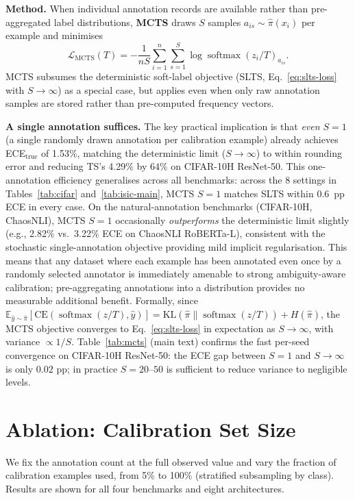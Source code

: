\documentclass[10pt,journal,compsoc]{IEEEtran}
\newcommand{\pihat}{\hat{\pi}}
\newcommand{\bE}{\mathbb{E}}
\newcommand{\KL}{\mathrm{KL}}
\begin{document}
\noindent\textbf{Method.}
When individual annotation records are available rather than pre-aggregated label distributions, \textbf{MCTS} draws $S$ samples $a_{is}\sim\pihat(x_i)$ per example and minimises
\[
  \mathcal{L}_{\text{MCTS}}(T) = -\frac{1}{nS}\sum_{i=1}^n\sum_{s=1}^S \log\operatorname{softmax}(z_i/T)_{a_{is}}.
\]
MCTS subsumes the deterministic soft-label objective (SLTS, Eq.~\ref{eq:slts-loss} with $S\!\to\!\infty$) as a special case, but applies even when only raw annotation samples are stored rather than pre-computed frequency vectors.

\noindent\textbf{A single annotation suffices.}
The key practical implication is that \emph{even $S=1$} (a single randomly drawn annotation per calibration example) already achieves ECE$_\text{true}$ of 1.53\%, matching the deterministic limit ($S\!\to\!\infty$) to within rounding error and reducing TS's 4.29\% by $64\%$ on CIFAR-10H ResNet-50.  This one-annotation efficiency generalises across all benchmarks: across the 8 settings in Tables~\ref{tab:cifar} and~\ref{tab:isic-main}, MCTS $S{=}1$ matches SLTS within 0.6~pp ECE in every case.  On the natural-annotation benchmarks (CIFAR-10H, ChaosNLI), MCTS $S{=}1$ occasionally \emph{outperforms} the deterministic limit slightly (e.g., 2.82\% vs.\ 3.22\% ECE on ChaosNLI RoBERTa-L), consistent with the stochastic single-annotation objective providing mild implicit regularisation.  This means that any dataset where each example has been annotated even once by a randomly selected annotator is immediately amenable to strong ambiguity-aware calibration; pre-aggregating annotations into a distribution provides no measurable additional benefit.  Formally, since $\bE_{\hat{y}\sim\pihat}[\mathrm{CE}(\operatorname{softmax}(z/T),\hat{y})] = \KL(\pihat\|\operatorname{softmax}(z/T)) + H(\pihat)$, the MCTS objective converges to Eq.~\eqref{eq:slts-loss} in expectation as $S\to\infty$, with variance $\propto 1/S$.  Table~\ref{tab:mcts} (main text) confirms the fast per-seed convergence on CIFAR-10H ResNet-50: the ECE gap between $S=1$ and $S\to\infty$ is only $0.02$ pp; in practice $S=20$--$50$ is sufficient to reduce variance to negligible levels.

\section{Ablation: Calibration Set Size}
\label{app:calset-size}

We fix the annotation count at the full observed value and vary the fraction of calibration examples used, from 5\% to 100\% (stratified subsampling by class).  Results are shown for all four benchmarks and eight architectures.
\end{document}
